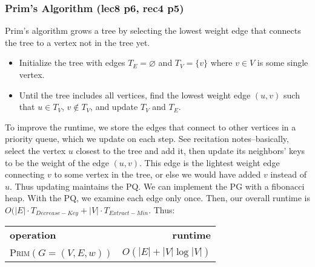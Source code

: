 \documentclass{article}
\begin{document}
\begin{multicols}{2}
	\subsubsection{Prim's Algorithm (lec8 p6, rec4 p5)}
	Prim's algorithm grows a tree by selecting the lowest weight edge that connects the tree to a vertex not in the tree yet.
	\begin{itemize}[noitemsep, topsep=0pt]
		\item Initialize the tree with edges $T_E = \varnothing$ and $T_V = \{v\}$ where $v\in V$ is some single vertex.
		\item Until the tree includes all vertices, find the lowest weight edge $(u,v)$ such that $u \in T_V$, $v \notin T_V$, and update $T_V$ and $T_E$.
	\end{itemize}
	To improve the runtime, we store the edges that connect to other vertices in a priority queue, which we update on each step. See recitation notes--basically, select the vertex $u$ closest to the tree and add it, then update its neighbors' keys to be the weight of the edge $(u,v)$. This edge is the lightest weight edge connecting $v$ to some vertex in the tree, or else we would have added $v$ instead of $u$. Thus updating maintains the PQ.
	We can implement the PG with a fibonacci heap. With the PQ, we examine each edge only once. Then, our overall runtime is $O(|E|\cdot T_{Decrease-Key} + |V|\cdot T_{Extract-Min}$. Thus:
	\begin{center}
		\begin{tabular}{lr}
			\textbf{operation} & \textbf{runtime} \\
			\textsc{Prim}$(G=(V, E, w))$ & $O(|E| + |V|\log |V|)$ \\
		\end{tabular}
	\end{center}


\end{multicols}
\newpage
\end{document}
